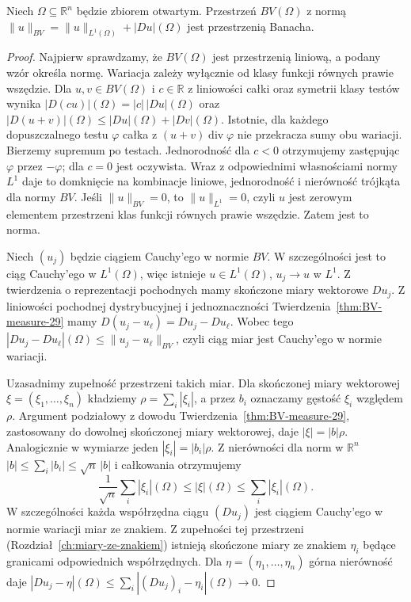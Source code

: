 \begin{twierdzenie}
\label{thm:BV-banach-29}
Niech $\Omega\subseteq\mathbb R^n$ będzie zbiorem otwartym.
Przestrzeń $BV(\Omega)$ z normą
$\|u\|_{BV}=\|u\|_{L^1(\Omega)}+|Du|(\Omega)$
jest przestrzenią Banacha.
\end{twierdzenie}
\begin{proof}
Najpierw sprawdzamy, że $BV(\Omega)$ jest przestrzenią
liniową, a podany wzór określa normę. Wariacja zależy
wyłącznie od klasy funkcji równych prawie wszędzie.
Dla $u,v\in BV(\Omega)$ i $c\in\mathbb R$ z liniowości
całki oraz symetrii klasy testów wynika
$|D(cu)|(\Omega)=|c|\,|Du|(\Omega)$ oraz
$|D(u+v)|(\Omega)\le |Du|(\Omega)+|Dv|(\Omega)$.
Istotnie, dla każdego dopuszczalnego testu $\varphi$
całka z $(u+v)\operatorname{div}\varphi$ nie przekracza
sumy obu wariacji. Bierzemy supremum po testach.
Jednorodność dla $c<0$ otrzymujemy zastępując
$\varphi$ przez $-\varphi$; dla $c=0$ jest oczywista.
Wraz z odpowiednimi własnościami normy $L^1$ daje to
domknięcie na kombinacje liniowe, jednorodność
i nierówność trójkąta dla normy $BV$.
Jeśli $\|u\|_{BV}=0$, to $\|u\|_{L^1}=0$,
czyli $u$ jest zerowym elementem przestrzeni klas
funkcji równych prawie wszędzie. Zatem jest to norma.

Niech $(u_j)$ będzie ciągiem Cauchy'ego w normie
$BV$. W szczególności jest to ciąg Cauchy'ego w
$L^1(\Omega)$, więc istnieje $u\in L^1(\Omega)$,
$u_j\to u$ w $L^1$. Z twierdzenia o reprezentacji
pochodnych mamy skończone miary wektorowe $Du_j$.
Z liniowości pochodnej dystrybucyjnej i jednoznaczności
Twierdzenia~\ref{thm:BV-measure-29} mamy
$D(u_j-u_\ell)=Du_j-Du_\ell$. Wobec tego
$|Du_j-Du_\ell|(\Omega)\le\|u_j-u_\ell\|_{BV}$,
czyli ciąg miar jest Cauchy'ego w normie wariacji.

Uzasadnimy zupełność przestrzeni takich miar.
Dla skończonej miary wektorowej $\xi=(\xi_1,\ldots,\xi_n)$
kładziemy $\rho=\sum_i|\xi_i|$, a przez $b_i$
oznaczamy gęstość $\xi_i$ względem $\rho$.
Argument podziałowy z dowodu
Twierdzenia~\ref{thm:BV-measure-29}, zastosowany
do dowolnej skończonej miary wektorowej, daje
$|\xi|=|b|\rho$. Analogicznie w wymiarze jeden
$|\xi_i|=|b_i|\rho$. Z nierówności dla norm w $\mathbb R^n$
$|b|\le\sum_i|b_i|\le\sqrt n\,|b|$ i całkowania
otrzymujemy
\[
 \frac1{\sqrt n}\sum_i|\xi_i|(\Omega)
 \le|\xi|(\Omega)\le\sum_i|\xi_i|(\Omega).
\]
W szczególności każda współrzędna ciągu $(Du_j)$
jest ciągiem Cauchy'ego w normie wariacji miar ze znakiem.
Z zupełności tej przestrzeni
(Rozdział~\ref{ch:miary-ze-znakiem}) istnieją skończone
miary ze znakiem $\eta_i$ będące granicami odpowiednich
współrzędnych. Dla $\eta=(\eta_1,\ldots,\eta_n)$
górna nierówność daje
$|Du_j-\eta|(\Omega)\le\sum_i|(Du_j)_i-\eta_i|(\Omega)\to0$.


\end{proof}
